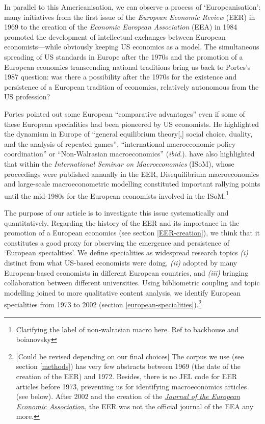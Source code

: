\documentclass[]{elsarticle} %
\begin{document}
In parallel to this Americanisation, we can observe a process of
`Europeanisation': many initiatives from the first issue of the
\emph{European Economic Review} (EER) in 1969 to the creation of the
\emph{Economic European Association} (EEA) in 1984 promoted the
development of intellectual exchanges between European
economists---while obviously keeping US economics as a model. The
simultaneous spreading of US standards in Europe after the 1970s and the
promotion of a European economics transcending national traditions bring
us back to Portes's 1987 question: was there a possibility after the
1970s for the existence and persistence of a European tradition of
economics, relatively autonomous from the US profession?

Portes pointed out some European ``comparative advantages''
\citep[1332]{portes1987} even if some of these European specialities had
been pioneered by US economists. He highlighted the dynamism in Europe
of ``general equilibrium theory{[},{]} social choice, duality, and the
analysis of repeated games'', ``international macroeconomic policy
coordination'' or ``Non-Walrasian macroeconomics'' (\emph{ibid}.).
\citet{goutsmedt2021} have also highlighted that within the
\emph{International Seminar on Macroeconomics} (ISoM), whose proceedings
were published annually in the EER, Disequilibrium macroeconomics and
large-scale macroeconometric modelling constituted important rallying
points until the mid-1980s for the European economists involved in the
ISoM.\footnote{Clarifying the label of non-walrasian macro here. Ref to
  backhouse and boianovsky}

The purpose of our article is to investigate this issue systematically
and quantitatively. Regarding the history of the EER and its importance
in the promotion of a European economics (see section
\ref{EER-creation}), we think that it constitutes a good proxy for
observing the emergence and persistence of `European specialities'. We
define specialities as widespread research topics \emph{(i)} distinct
from what US-based economists were doing, \emph{(ii)} adopted by many
European-based economists in different European countries, and
\emph{(iii)} bringing collaboration between different universities.
Using bibliometric coupling and topic modelling joined to more
qualitative content analysis, we identify European specialities from
1973 to 2002 (section \ref{european-specialities}).\footnote{{[}Could be
  revised depending on our final choices{]} The corpus we use (see
  section \ref{methods}) has very few abstracts between 1969 (the date
  of the creation of the EER) and 1972. Besides, there is no JEL code
  for EER articles before 1973, preventing us for identifying
  macroeconomics articles (see below). After 2002 and the creation of
  the \href{https://academic.oup.com/jeea}{\emph{Journal of the European
  Economic Association}}\emph{,} the EER was not the official journal of
  the EEA any more.}
\end{document}
